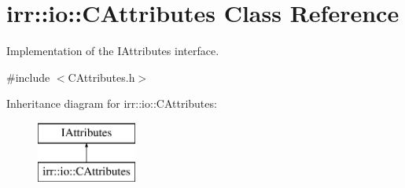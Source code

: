 \hypertarget{classirr_1_1io_1_1_c_attributes}{\section{irr\-:\-:io\-:\-:C\-Attributes Class Reference}
\label{classirr_1_1io_1_1_c_attributes}
}


Implementation of the I\-Attributes interface.  




{\ttfamily \#include $<$C\-Attributes.\-h$>$}

Inheritance diagram for irr\-:\-:io\-:\-:C\-Attributes\-:\begin{figure}[H]
\begin{center}
\leavevmode
\includegraphics[height=2.000000cm]{classirr_1_1io_1_1_c_attributes}
\end{center}
\end{figure}
